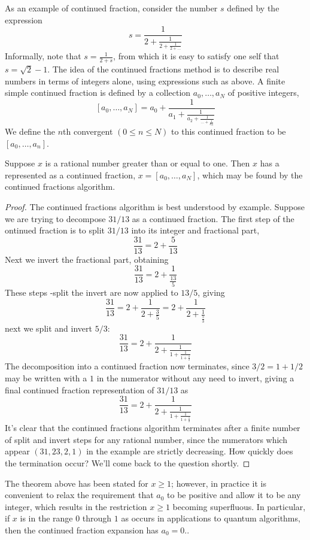 As an example of continued fraction, consider the number $s$ defined by the expression
\[
s=\frac{1}{2+\frac{1}{2+\frac{1}{2+\ldots}}}
\]
Informally, note that $s=\frac{1}{2+s}$, from which it is easy to satisfy one self that $s=\sqrt{2}-1$. The idea of the continued fractions method is to describe real numbers in terms of integers alone, using expressions such as above. A finite simple continued fraction is defined by a collection $a_0,\ldots,a_N$ of positive integers,
\[
[a_0,\ldots,a_N] = a_0 + \frac{1}{a_1+\frac{1}{a_2+\frac{1}{\ldots+\frac{1}{a_N}}}}
\]
We define the $n$th convergent $(0\leq n\leq N)$ to this continued fraction to be $[a_0,\ldots,a_n]$.
\begin{theorem}
    Suppose $x$ is a rational number greater than or equal to one. Then $x$ has a represented as a continued fraction, $x=[a_0,\ldots,a_N]$, which may be found by the continued fractions algorithm.
\end{theorem}
\begin{proof}
    The continued fractions algorithm is best understood by example. Suppose we are trying to decompose $31/13$ as a continued fraction. The first step of the ontinued fraction is to split $31/13$ into its integer and fractional part,
    \[
    \frac{31}{13}=2+\frac{5}{13}
    \]
    Next we invert the fractional part, obtaining
    \[
    \frac{31}{13}=2+\frac{1}{\frac{13}{5}}
    \]
    These steps -split the invert are now applied to $13/5$, giving
    \[
    \frac{31}{13}=2+\frac{1}{2+\frac{3}{5}}=2+\frac{1}{2+\frac{1}{\frac{5}{3}}}
    \]
    next we split and invert $5/3$:
    \[
    \frac{31}{13}=2+\frac{1}{2+\frac{1}{1+\frac{1}{1+\frac{1}{2}}}}
    \]
    The decomposition into a continued fraction now terminates, since $3/2=1+1/2$ may be written with a $1$ in the numerator without any need to invert, giving a final continued fraction representation of $31/13$ as 
    \[
    \frac{31}{13}=2+\frac{1}{2+\frac{1}{1+\frac{1}{1+\frac{1}{2}}}}
    \]
    It's clear that the continued fractions algorithm terminates after a finite number of split and invert steps for any rational number, since the numerators which appear $(31,23,2,1)$ in the example are strictly decreasing. How quickly does the termination occur? We'll come back to the question shortly.
\end{proof}

The theorem above has been stated for $x\geq1$; however, in practice it is convenient to relax the requirement that $a_0$ to be positive and allow it to be any integer, which results in the restriction $x\geq1$ becoming superfluous. In particular, if $x$ is in the range $0$ through $1$ as occurs in applications to quantum algorithms, then the continued fraction expansion has $a_0=0$..


